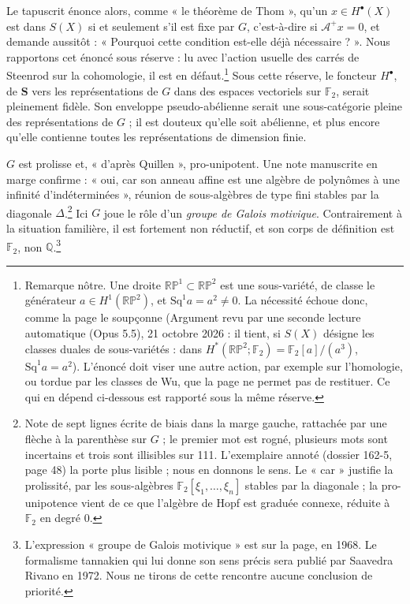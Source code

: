 \documentclass[11pt,a4paper]{article}
\begin{document}
Le tapuscrit énonce alors, comme « le théorème de Thom », qu'un $x \in
H^{\bullet}(X)$ est dans $S(X)$ si et seulement s'il est fixe par $G$,
c'est-à-dire si $\mathcal{A}^{+} x = 0$, et demande aussitôt : « Pourquoi
cette condition est-elle déjà nécessaire ? ». Nous rapportons cet énoncé sous
réserve : lu avec l'action usuelle des carrés de Steenrod sur la cohomologie,
il est en défaut.\footnote{Remarque nôtre. Une droite $\mathbb{RP}^{1} \subset
\mathbb{RP}^{2}$ est une sous-variété, de classe le générateur $a \in
H^{1}(\mathbb{RP}^{2})$, et $\mathrm{Sq}^{1}a = a^{2} \neq 0$. La nécessité échoue donc, comme la page le soupçonne (Argument revu par une seconde lecture automatique (Opus 5.5), 21 octobre 2026 : il tient, si $S(X)$ désigne les classes duales de sous-variétés : dans $H^{*}(\mathbb{RP}^{2}; \mathbb{F}_2) = \mathbb{F}_2[a]/(a^{3})$, $\mathrm{Sq}^{1}a = a^{2}$). L'énoncé doit viser une autre action,
par exemple sur l'homologie, ou tordue par les classes de Wu, que la page ne
permet pas de restituer. Ce qui en dépend ci-dessous est rapporté sous la
même réserve.} Sous cette réserve, le foncteur $H^{\bullet}$, de $\mathbf{S}$
vers les représentations de $G$ dans des espaces vectoriels sur $\mathbb{F}_2$,
serait pleinement fidèle. Son enveloppe pseudo-abélienne serait une
sous-catégorie pleine des représentations de $G$ ; il est douteux qu'elle soit
abélienne, et plus encore qu'elle contienne toutes les représentations de
dimension finie.

$G$ est prolisse et, « d'après Quillen », pro-unipotent. Une note manuscrite
en marge confirme : « oui, car son anneau affine est une algèbre de polynômes
à une infinité d'indéterminées », réunion de sous-algèbres de type fini
stables par la diagonale $\Delta$.\footnote{Note de sept lignes écrite de biais
dans la marge gauche, rattachée par une flèche à la parenthèse sur $G$ ; le
premier mot est rogné, plusieurs mots sont incertains et trois sont illisibles
sur 111. L'exemplaire annoté (dossier 162-5, page 48) la porte plus lisible ;
nous en donnons le sens. Le « car » justifie la prolissité, par les
sous-algèbres $\mathbb{F}_2[\xi_1, \ldots, \xi_n]$ stables par la diagonale ;
la pro-unipotence vient de ce que l'algèbre de Hopf est graduée connexe,
réduite à $\mathbb{F}_2$ en degré 0.} Ici $G$ joue le rôle d'un \emph{groupe
de Galois motivique}. Contrairement à la situation familière, il est fortement
non réductif, et son corps de définition est $\mathbb{F}_2$, non
$\mathbb{Q}$.\footnote{L'expression « groupe de Galois motivique » est sur la
page, en 1968. Le formalisme tannakien qui lui donne son sens précis sera
publié par Saavedra Rivano en 1972. Nous ne tirons de cette rencontre aucune
conclusion de priorité.}
\end{document}
